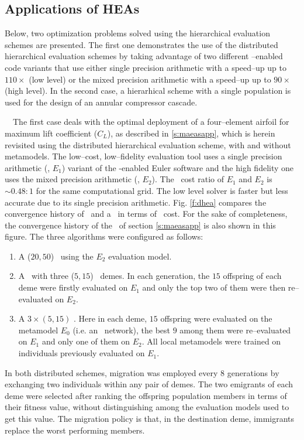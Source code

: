 \documentclass{vki_ls}
\newcommand{\xeraki}{\Pisymbol{ding}{13}~~}
\begin{document}
%
\subsection{Applications of HEAs}

Below, two optimization problems solved using the hierarchical evaluation schemes are presented. 
The first one demonstrates the use of the distributed hierarchical evaluation schemes by taking advantage of two different \GPU--enabled code variants that use either single precision arithmetic with a speed--up up to $110\!\times$ (low level) or the mixed precision arithmetic  with a speed--up up to $90\!\times$  (high level). 
In the second case, a hierarhical scheme with a single population is used for the design of an annular compressor cascade.

%
%
\xeraki The first case deals with the optimal deployment of a four--element airfoil for maximum lift coefficient ($C_L$), as described in \ref{s:maeasapp}, which is herein revisited using the distributed hierarchical evaluation scheme, with and without metamodels.
The low--cost, low--fidelity evaluation tool uses a single precision arithmetic (\GPUS, $E_1$) variant of the \GPU\--enabled Euler software and the high fidelity one uses the mixed precision arithmetic (\GPUM, $E_2$). 
The \CPU\ cost ratio of $E_1$ and $E_2$ is $\sim\!0.48\!:\!1$ for the same computational grid. The low level solver is faster but less accurate due to its single precision arithmetic.
Fig. \ref{f:dhea} compares the convergence history of \DHEA\ and a \DHMAEA\ in terms of \CPU\ cost. For the sake of completeness, the convergence history of the \EA\ of section \ref{s:maeasapp} is also shown in this figure. The three algorithms were configured as follows:
\begin{enumerate}
\item A ($20, 50$) \EA\ using the $E_2$ evaluation model.
\item A \DHEA\ with three ($5, 15$) \EA\ demes. In each generation, the $15$ offspring of each deme were firstly evaluated on $E_1$ and only the top two of them were then re--evaluated on $E_2$.
\item A $3\times (5, 15)$ \DHMAEA. Here in each deme, $15$ offspring were evaluated on the metamodel $E_0$ (i.e. an \RBF\ network), the best $9$ among them were re--evaluated on $E_1$ and only one of them on $E_2$. All local metamodels were trained on individuals previously evaluated on $E_1$.
\end{enumerate}
In both distributed schemes, migration was employed every $8$ generations by exchanging two individuals within any pair of demes. The two emigrants of each deme were selected after ranking the offspring population members in terms of their fitness value, without distinguishing among the evaluation models used to get this value. The migration policy is that, in the destination deme, immigrants replace the worst performing members.
\end{document}
